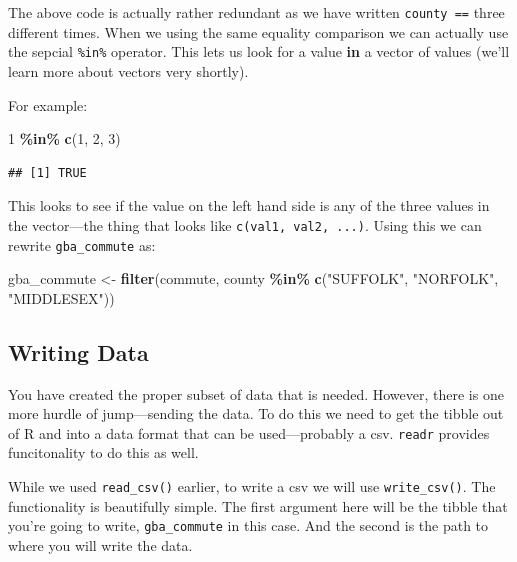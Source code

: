 \documentclass[
]{book}
\newenvironment{Shaded}{\begin{snugshade}}{\end{snugshade}}
\newcommand{\DecValTok}[1]{\textcolor[rgb]{0.00,0.00,0.81}{#1}}
\newcommand{\KeywordTok}[1]{\textcolor[rgb]{0.13,0.29,0.53}{\textbf{#1}}}
\newcommand{\NormalTok}[1]{#1}
\newcommand{\OperatorTok}[1]{\textcolor[rgb]{0.81,0.36,0.00}{\textbf{#1}}}
\newcommand{\StringTok}[1]{\textcolor[rgb]{0.31,0.60,0.02}{#1}}
\begin{document}
The above code is actually rather redundant as we have written \texttt{county\ ==} three different times. When we using the same equality comparison we can actually use the sepcial \texttt{\%in\%} operator. This lets us look for a value \textbf{in} a vector of values (we'll learn more about vectors very shortly).

For example:

\begin{Shaded}
\begin{Highlighting}[]
\DecValTok{1} \OperatorTok{\%in\%}\StringTok{ }\KeywordTok{c}\NormalTok{(}\DecValTok{1}\NormalTok{, }\DecValTok{2}\NormalTok{, }\DecValTok{3}\NormalTok{)}
\end{Highlighting}
\end{Shaded}

\begin{verbatim}
## [1] TRUE
\end{verbatim}

This looks to see if the value on the left hand side is any of the three values in the vector---the thing that looks like \texttt{c(val1,\ val2,\ ...)}. Using this we can rewrite \texttt{gba\_commute} as:

\begin{Shaded}
\begin{Highlighting}[]
\NormalTok{gba\_commute \textless{}{-}}\StringTok{ }\KeywordTok{filter}\NormalTok{(commute, county }\OperatorTok{\%in\%}\StringTok{ }\KeywordTok{c}\NormalTok{(}\StringTok{"SUFFOLK"}\NormalTok{, }\StringTok{"NORFOLK"}\NormalTok{, }\StringTok{"MIDDLESEX"}\NormalTok{))}
\end{Highlighting}
\end{Shaded}

\hypertarget{writing-data}{%
\subsection{Writing Data}\label{writing-data}}

You have created the proper subset of data that is needed. However, there is one more hurdle of jump---sending the data. To do this we need to get the tibble out of R and into a data format that can be used---probably a csv. \texttt{readr} provides funcitonality to do this as well.

While we used \texttt{read\_csv()} earlier, to write a csv we will use \texttt{write\_csv()}. The functionality is beautifully simple. The first argument here will be the tibble that you're going to write, \texttt{gba\_commute} in this case. And the second is the path to where you will write the data.
\end{document}
